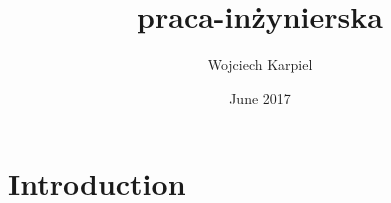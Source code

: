 \documentclass{article}
\title{praca-inżynierska}
\author{Wojciech Karpiel}
\date{June 2017}
\begin{document}
\maketitle

\section{Introduction}
\end{document}
